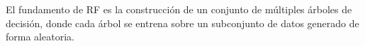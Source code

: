 \documentclass[letterpaper,12pt, twoside]{report}
\providecommand{\DIFdeltex}[1]{{\protect\color{red} \scriptsize #1}} %
\providecommand{\DIFdel}[1]{\texorpdfstring{\DIFdeltex{#1}}{}} %
\begin{document}
\DIFdel{El fundamento de RF es la construcci\'on de un conjunto de m\'ultiples \'arboles de decisi\'on, donde cada \'arbol se entrena sobre un subconjunto de datos generado de forma aleatoria.
}%

\end{document}
